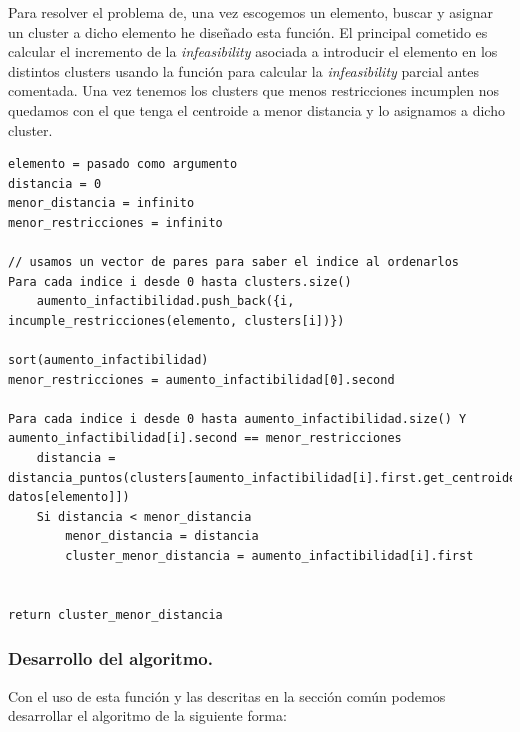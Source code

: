 \documentclass[12pt, spanish]{article}
\begin{document}
Para resolver el problema de, una vez escogemos un elemento, buscar y asignar un cluster a dicho elemento he diseñado esta función. El principal cometido es calcular el incremento de la \textit{infeasibility} asociada a introducir el elemento en los distintos clusters usando la función para calcular la \textit{infeasibility} parcial antes comentada. Una vez tenemos los clusters que menos restricciones incumplen nos quedamos con el que tenga el centroide a menor distancia y lo asignamos a dicho cluster.


\begin{lstlisting}
elemento = pasado como argumento
distancia = 0
menor_distancia = infinito
menor_restricciones = infinito

// usamos un vector de pares para saber el indice al ordenarlos
Para cada indice i desde 0 hasta clusters.size()
	aumento_infactibilidad.push_back({i, incumple_restricciones(elemento, clusters[i])})

sort(aumento_infactibilidad)
menor_restricciones = aumento_infactibilidad[0].second

Para cada indice i desde 0 hasta aumento_infactibilidad.size() Y aumento_infactibilidad[i].second == menor_restricciones
	distancia = distancia_puntos(clusters[aumento_infactibilidad[i].first.get_centroide(), datos[elemento]])
	Si distancia < menor_distancia
		menor_distancia = distancia
		cluster_menor_distancia = aumento_infactibilidad[i].first


return cluster_menor_distancia
\end{lstlisting}


\subsubsection{Desarrollo del algoritmo.}

Con el uso de esta función y las descritas en la sección común podemos desarrollar el algoritmo de la siguiente forma:
\end{document}
